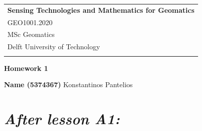 \documentclass[a4paper,12pt]{article} %
\begin{document}



\thispagestyle{empty} %

\begin{tabular}{p{15.5cm}} %
{\large \bf Sensing Technologies and Mathematics for Geomatics} \\
GEO1001.2020 \\ MSc Geomatics \\ Delft University of Technology \\
\hline %
\\
\end{tabular} %

\vspace*{0.3cm} %

\begin{center} %
	{\Large \bf Homework 1} %
	\vspace{2mm}
	
	{\bf Name (5374367)} Konstantinos Pantelios %
		
\end{center}  

\vspace{0.4cm}




\section{\it After lesson A1:}
\end{document}
